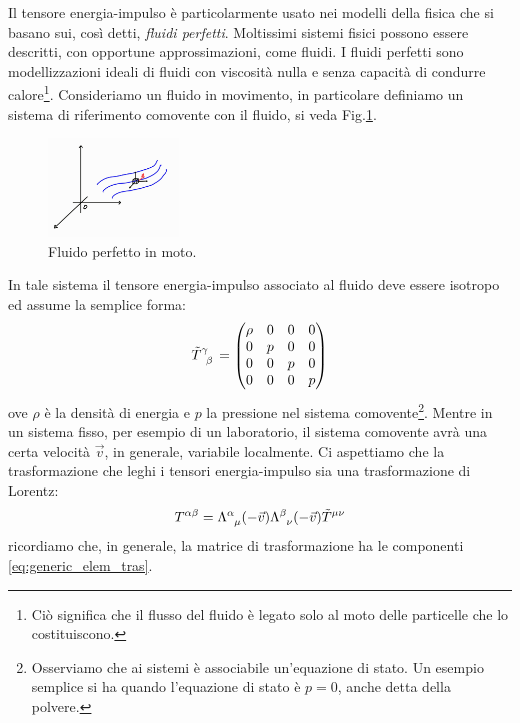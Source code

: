Il tensore energia-impulso è particolarmente usato nei modelli della fisica che si basano sui, così detti, \textit{fluidi perfetti}. Moltissimi sistemi fisici possono essere descritti, con opportune approssimazioni, come fluidi. I fluidi perfetti sono modellizzazioni ideali di fluidi con viscosità nulla e senza capacità di condurre calore\footnote{Ciò significa che il flusso del fluido è legato solo al moto delle particelle che lo costituiscono.}. Consideriamo un fluido in movimento, in particolare definiamo un sistema di riferimento comovente con il fluido, si veda Fig.\ref{fig:fluido}. 
\begin{figure}[H]
    \centering
    \includegraphics[width=0.31\textwidth]{Immagini/Fluido.jpg}
    \caption{Fluido perfetto in moto.}
    \label{fig:fluido}
\end{figure}
In tale sistema il tensore energia-impulso associato al fluido deve essere isotropo ed  assume la semplice forma:
\begin{equation}
\Tilde{T}\indices{^\gamma_\beta}=
\begin{pmatrix}
  \rho & 0 & 0 & 0  \\
  0 & p & 0 & 0  \\
  0 & 0 & p & 0   \\
  0 & 0 & 0 & p
\end{pmatrix}
\end{equation}
ove $\rho$ è la densità di energia e $p$ la pressione nel sistema comovente\footnote{Osserviamo che ai sistemi è associabile un'equazione di stato. Un esempio semplice si ha quando l'equazione di stato è  $p=0$, anche detta della polvere.}. Mentre in un sistema fisso, per esempio di un laboratorio, il sistema comovente avrà una certa velocità $\Vec{v}$, in generale, variabile localmente. Ci aspettiamo che la trasformazione che leghi i tensori energia-impulso sia una trasformazione di Lorentz:
\begin{equation}
T\indices{^{\alpha\beta}}=\Lambda\indices{^\alpha_\mu}(-\Vec{v})\Lambda\indices{^\beta_\nu}(-\Vec{v})\Tilde{T}\indices{^{\mu\nu}}
\end{equation}
ricordiamo che, in generale, la matrice di trasformazione ha le componenti \eqref{eq:generic_elem_tras}. 

